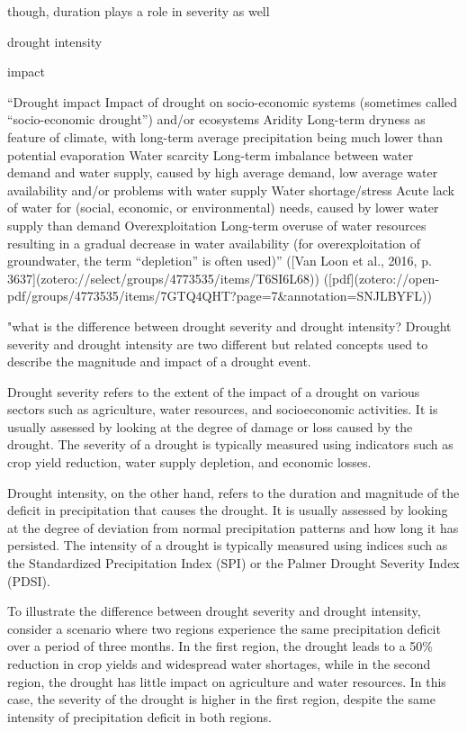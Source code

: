{though, duration plays a role in severity as well


drought intensity


impact

“Drought impact Impact of drought on socio-economic systems (sometimes called “socio-economic drought”) and/or ecosystems Aridity Long-term dryness as feature of climate, with long-term average precipitation being much lower than potential evaporation Water scarcity Long-term imbalance between water demand and water supply, caused by high average demand, low average water availability and/or problems with water supply Water shortage/stress Acute lack of water for (social, economic, or environmental) needs, caused by lower water supply than demand Overexploitation Long-term overuse of water resources resulting in a gradual decrease in water availability (for overexploitation of groundwater, the term “depletion” is often used)” ([Van Loon et al., 2016, p. 3637](zotero://select/groups/4773535/items/T6SI6L68)) ([pdf](zotero://open-pdf/groups/4773535/items/7GTQ4QHT?page=7&annotation=SNJLBYFL))




"what is the difference between drought severity and drought intensity?
Drought severity and drought intensity are two different but related concepts used to describe the magnitude and impact of a drought event.

Drought severity refers to the extent of the impact of a drought on various sectors such as agriculture, water resources, and socioeconomic activities. It is usually assessed by looking at the degree of damage or loss caused by the drought. The severity of a drought is typically measured using indicators such as crop yield reduction, water supply depletion, and economic losses.

Drought intensity, on the other hand, refers to the duration and magnitude of the deficit in precipitation that causes the drought. It is usually assessed by looking at the degree of deviation from normal precipitation patterns and how long it has persisted. The intensity of a drought is typically measured using indices such as the Standardized Precipitation Index (SPI) or the Palmer Drought Severity Index (PDSI).

To illustrate the difference between drought severity and drought intensity, consider a scenario where two regions experience the same precipitation deficit over a period of three months. In the first region, the drought leads to a 50\% reduction in crop yields and widespread water shortages, while in the second region, the drought has little impact on agriculture and water resources. In this case, the severity of the drought is higher in the first region, despite the same intensity of precipitation deficit in both regions.

}
